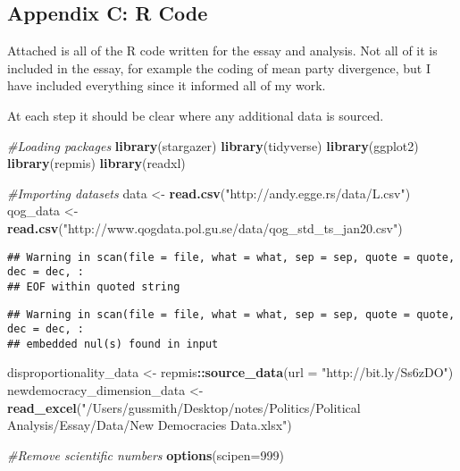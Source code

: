 \documentclass[]{article}
\author{}
\date{\vspace{-2.5em}}
\newenvironment{Shaded}{\begin{snugshade}}{\end{snugshade}}
\newcommand{\CommentTok}[1]{\textcolor[rgb]{0.56,0.35,0.01}{\textit{#1}}}
\newcommand{\DataTypeTok}[1]{\textcolor[rgb]{0.13,0.29,0.53}{#1}}
\newcommand{\DecValTok}[1]{\textcolor[rgb]{0.00,0.00,0.81}{#1}}
\newcommand{\KeywordTok}[1]{\textcolor[rgb]{0.13,0.29,0.53}{\textbf{#1}}}
\newcommand{\NormalTok}[1]{#1}
\newcommand{\OperatorTok}[1]{\textcolor[rgb]{0.81,0.36,0.00}{\textbf{#1}}}
\newcommand{\StringTok}[1]{\textcolor[rgb]{0.31,0.60,0.02}{#1}}
\begin{document}
\hypertarget{appendix-c-r-code}{%
\subsection{Appendix C: R Code}\label{appendix-c-r-code}}

Attached is all of the R code written for the essay and analysis. Not
all of it is included in the essay, for example the coding of mean party
divergence, but I have included everything since it informed all of my
work.

At each step it should be clear where any additional data is sourced.

\begin{Shaded}
\begin{Highlighting}[]
\CommentTok{#Loading packages}
\KeywordTok{library}\NormalTok{(stargazer)}
\KeywordTok{library}\NormalTok{(tidyverse)}
\KeywordTok{library}\NormalTok{(ggplot2)}
\KeywordTok{library}\NormalTok{(repmis)}
\KeywordTok{library}\NormalTok{(readxl)}

\CommentTok{#Importing datasets}
\NormalTok{data <-}\StringTok{ }\KeywordTok{read.csv}\NormalTok{(}\StringTok{"http://andy.egge.rs/data/L.csv"}\NormalTok{)}
\NormalTok{qog_data <-}\StringTok{ }\KeywordTok{read.csv}\NormalTok{(}\StringTok{"http://www.qogdata.pol.gu.se/data/qog_std_ts_jan20.csv"}\NormalTok{)}
\end{Highlighting}
\end{Shaded}

\begin{verbatim}
## Warning in scan(file = file, what = what, sep = sep, quote = quote, dec = dec, :
## EOF within quoted string
\end{verbatim}

\begin{verbatim}
## Warning in scan(file = file, what = what, sep = sep, quote = quote, dec = dec, :
## embedded nul(s) found in input
\end{verbatim}

\begin{Shaded}
\begin{Highlighting}[]
\NormalTok{disproportionality_data <-}\StringTok{ }\NormalTok{repmis}\OperatorTok{::}\KeywordTok{source_data}\NormalTok{(}\DataTypeTok{url =} \StringTok{"http://bit.ly/Ss6zDO"}\NormalTok{)}
\NormalTok{newdemocracy_dimension_data <-}\StringTok{ }\KeywordTok{read_excel}\NormalTok{(}\StringTok{"/Users/gussmith/Desktop/notes/Politics/Political Analysis/Essay/Data/New Democracies Data.xlsx"}\NormalTok{)}

\CommentTok{#Remove scientific numbers}
\KeywordTok{options}\NormalTok{(}\DataTypeTok{scipen=}\DecValTok{999}\NormalTok{)}
\end{Highlighting}
\end{Shaded}
\end{document}

